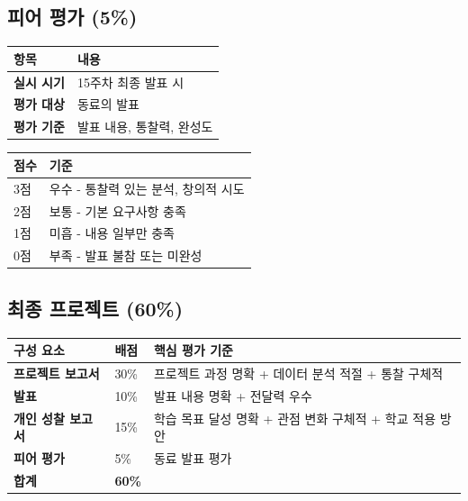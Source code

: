 \documentclass[11pt, a4paper]{article}
\begin{document}
\subsection{피어 평가 (5\%)}

\begin{table}[H]
\centering
\begin{tabular}{|L{3cm}|L{10.5cm}|}
\hline
{}
\textbf{항목} & \textbf{내용} \\
\hline
\textbf{실시 시기} & 15주차 최종 발표 시 \\
\hline
\textbf{평가 대상} & 동료의 발표 \\
\hline
\textbf{평가 기준} & 발표 내용, 통찰력, 완성도 \\
\hline
\end{tabular}
\end{table}

\begin{table}[H]
\centering
\begin{tabular}{|C{1.5cm}|L{12cm}|}
\hline
{}
\textbf{점수} & \textbf{기준} \\
\hline
3점 & 우수 - 통찰력 있는 분석, 창의적 시도 \\
\hline
2점 & 보통 - 기본 요구사항 충족 \\
\hline
1점 & 미흡 - 내용 일부만 충족 \\
\hline
0점 & 부족 - 발표 불참 또는 미완성 \\
\hline
\end{tabular}
\end{table}

\subsection{최종 프로젝트 (60\%)}

\begin{table}[H]
\centering
\begin{tabular}{|L{4cm}|C{1.5cm}|L{8cm}|}
\hline
{}
\textbf{구성 요소} & \textbf{배점} & \textbf{핵심 평가 기준} \\
\hline
\textbf{프로젝트 보고서} & 30\% & 프로젝트 과정 명확 + 데이터 분석 적절 + 통찰 구체적 \\
\hline
\textbf{발표} & 10\% & 발표 내용 명확 + 전달력 우수 \\
\hline
\textbf{개인 성찰 보고서} & 15\% & 학습 목표 달성 명확 + 관점 변화 구체적 + 학교 적용 방안 \\
\hline
\textbf{피어 평가} & 5\% & 동료 발표 평가 \\
\hline
\textbf{합계} & \textbf{60\%} & \\
\hline
\end{tabular}
\end{table}
\end{document}
